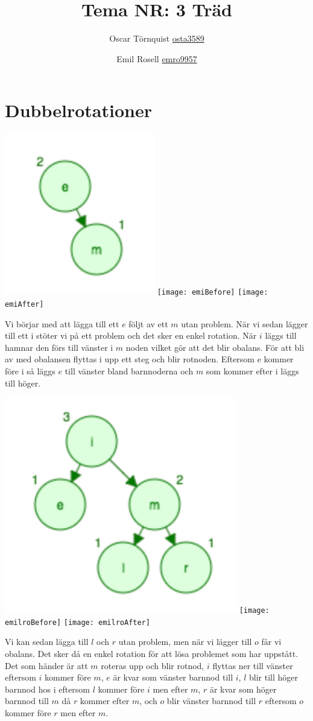 \documentclass[a5paper,10pt,oneside]{article}
\title{Tema NR: 3 Träd}
\author{Oscar Törnquist \url{osta3589} \and Emil Rosell \url{emro9957}}
\begin{document}
\maketitle

\section*{Dubbelrotationer}

\includegraphics[scale=0.7]{em}
\texttt{[image: emiBefore]}
\texttt{[image: emiAfter]}


Vi börjar med att lägga till ett $e$ följt av ett $m$ utan problem. När vi sedan lägger till ett i stöter vi på ett problem och det sker en enkel rotation. När $i$ läggs till hamnar den förs till vänster i $m$ noden vilket gör att det blir obalans. För att bli av med obalansen flyttas i upp ett steg och blir rotnoden. Eftersom e kommer före i så läggs $e$ till vänster bland barnnoderna och $m$ som kommer efter i läggs till höger. 

\includegraphics[scale=0.45]{emilr}
\texttt{[image: emilroBefore]}
\texttt{[image: emilroAfter]}

Vi kan sedan lägga till $l$ och $r$ utan problem, men när vi lägger till $o$ får vi obalans. Det sker då en enkel rotation för att lösa problemet som har uppstått. Det som händer är att $m$ roteras upp och blir rotnod, $i$ flyttas ner till vänster eftersom $i$ kommer före $m$, $e$ är kvar som vänster barnnod till $i$, $l$ blir till höger barnnod hos i eftersom $l$ kommer före $i$ men efter $m$, $r$ är kvar som höger barnnod till $m$ då $r$ kommer efter $m$, och $o$ blir vänster barnnod till $r$ eftersom $o$ kommer före $r$ men efter $m$.
\end{document}
